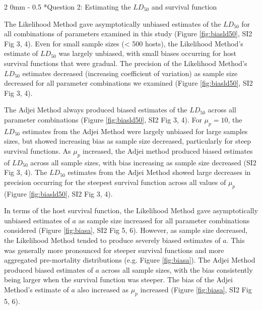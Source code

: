 \documentclass[12pt, a4paper]{article}
\makeatletter
\renewcommand{\subsection}{\@startsection
{subsection}%
{2}%
{0mm}%
{-\baselineskip}%
{0.5\baselineskip}%
{\normalfont\bf}} %
\makeatother
\begin{document}

\subsection*{Question 2: Estimating the $LD_{50}$ and survival function}

The Likelihood Method gave asymptotically unbiased estimates of the $LD_{50}$
for all combinations of parameters examined in this study (Figure \ref{fig:biasld50}, SI2 Fig 3, 4).  Even for
small sample sizes (< 500 hosts), the Likelihood Method's estimate of $LD_{50}$
was largely unbiased, with small biases occurring for host survival functions
that were gradual. The precision of the Likelihood Method's $LD_{50}$ estimates decreased
(increasing coefficient of variation) as sample size decreased for all
parameter combinations we examined (Figure \ref{fig:biasld50}, SI2 Fig 3, 4).

The Adjei Method
always produced biased estimates of the $LD_{50}$ across all parameter combinations (Figure \ref{fig:biasld50}, SI2 Fig 3, 4).  For $\mu_p = 10$, the $LD_{50}$
estimates from the Adjei Method were largely unbiased for large samples sizes,
but showed increasing bias as sample size decreased, particularly for steep
survival functions.  As $\mu_p$ increased, the Adjei method
produced biased estimates of $LD_{50}$ across all sample sizes, with bias
increasing as sample size decreased (SI2 Fig 3, 4). The $LD_{50}$ estimates from the Adjei
Method showed large decreases in precision occurring
for the steepest survival function across all values of $\mu_p$ (Figure \ref{fig:biasld50}, SI2 Fig 3, 4).



In terms of the host survival function, the Likelihood Method gave
asymptotically unbiased estimates of $a$ as sample size increased for
all parameter combinations considered (Figure \ref{fig:biasa}, SI2 Fig 5, 6).  However, as sample size decreased, the
Likelihood Method tended to produce severely biased estimates of $a$.
This was generally more pronounced for steeper survival functions and more
aggregated pre-mortality distributions (e.g. Figure \ref{fig:biasa}).  The Adjei Method produced
biased estimates of $a$ across all sample sizes, with the bias
consistently being larger when the survival function was steeper. The bias of
the Adjei Method's estimate of $a$ also increased as $\mu_p$ increased (Figure \ref{fig:biasa}, SI2 Fig 5, 6).
\end{document}
